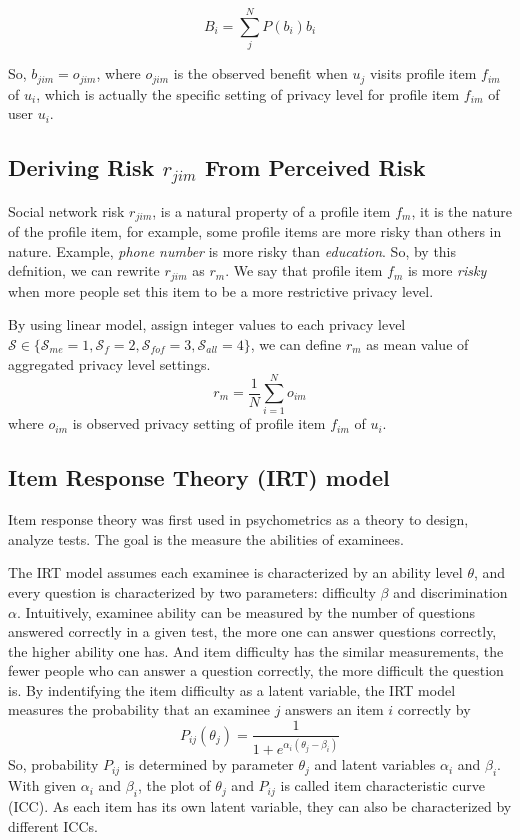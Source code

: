 \documentclass[a4paper]{article}
\begin{document}
\[ B_i = \sum_j^{N}P(b_i)b_i \]

So, $b_{jim} = o_{jim}$, where $o_{jim}$ is the observed
benefit when $u_j$ visits profile item $f_{im}$ of $u_i$, which is
actually the specific setting of privacy level for profile item
$f_{im}$ of user $u_i$.

\subsection{Deriving Risk $r_{jim}$ From Perceived Risk}
Social network risk $r_{jim}$, is a natural property of a profile item
$f_{m}$, it is the nature of the profile item, for example, some
profile items are more risky than others in nature. Example,
\emph{phone number} is more risky than \emph{education}. So, by this
defnition, we can rewrite $r_{jim}$ as $r_m$. We say that profile item
$f_m$ is more \emph{risky} when more people set this item to be a more
restrictive privacy level.

By using linear model, assign integer values to each privacy level
$\mathcal{S}\in \{\mathcal{S}_{me}=1, \mathcal{S}_{f}=2,
\mathcal{S}_{fof}=3, \mathcal{S}_{all}=4\}$, we can define $r_m$ as
mean value of aggregated privacy level settings.
\[ r_m = \frac{1}{N} \sum_{i=1}^No_{im} \]
where $o_{im}$ is observed privacy setting of profile item $f_{im}$
of $u_i$.

\subsection{Item Response Theory (IRT) model}
Item response theory was first used in psychometrics as a theory
to design, analyze tests. The goal is the measure the abilities of
examinees. 

The IRT model assumes each examinee is characterized by an ability
level $\theta$, and every question is characterized by two parameters:
difficulty $\beta$ and discrimination $\alpha$. Intuitively, examinee
ability can be measured by the number of questions answered correctly
in a given test, 
the more one can answer questions correctly, the higher ability
one has. And item difficulty has the similar measurements, the fewer
people who can answer a question correctly, the more difficult the
question is. By indentifying the item difficulty as a latent variable,
the IRT model measures the probability that an examinee $j$ answers an
item $i$ correctly by 
\begin{equation}
  P_{ij}(\theta_j) = \frac{1}{1+e^{\alpha_i(\theta_j-\beta_i)}}
\end{equation}
So, probability $P_{ij}$ is determined by parameter $\theta_j$ and
latent variables $\alpha_i$ and $\beta_i$. With given $\alpha_i$ and
$\beta_i$, the plot of $\theta_j$ and $P_{ij}$ is called item
characteristic curve (ICC). As each item has its own latent variable,
they can also be characterized by different ICCs. 
\end{document}
